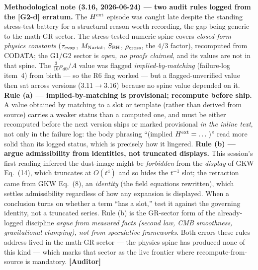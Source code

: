 \documentclass[11pt]{article}
\newcommand{\Auditor}{\textbf{\textcolor{teal!55!black}{[Auditor]}}}
\begin{document}
\smallskip\noindent\textbf{Methodological note (3.16, 2026-06-24) --- two audit rules logged from the [G2-d] erratum.} The $H^{\rm ext}$ episode was caught late despite the standing stress-test battery for a structural reason worth recording, the gap being generic to the math-GR sector. The stress-tested numeric spine covers \emph{closed-form physics constants} ($\tau_{\rm evap}$, $M_{\rm Nariai}$, $S_{\rm BH}$, $\rho_{\rm cross}$, the $4/3$ factor), recomputed from CODATA; the G1/G2 sector is \emph{open, no proofs claimed}, and its values are not in that spine. The $\tfrac{3}{16}\rho_{d0}/A$ value was flagged \emph{implied-by-matching} (failure-log item~4) from birth --- so the R6 flag worked --- but a flagged-unverified value then sat across versions (3.11$\to$3.16) because no spine value depended on it. \textbf{Rule (a) --- implied-by-matching is provisional; recompute before ship.} A value obtained by matching to a slot or template (rather than derived from source) carries a weaker status than a computed one, and must be either recomputed before the next version ships or marked provisional \emph{in the inline text}, not only in the failure log: the body phrasing ``(implied $H^{\rm ext}=\dots$)'' read more solid than its logged status, which is precisely how it lingered. \textbf{Rule (b) --- argue admissibility from identities, not truncated displays.} This session's first reading inferred the dust-image might be \emph{forbidden} from the \emph{display} of GKW Eq.~(14), which truncates at $O(t^4)$ and so hides the $t^{-1}$ slot; the retraction came from GKW Eq.~(8), an \emph{identity} (the field equations rewritten), which settles admissibility regardless of how any expansion is displayed. When a conclusion turns on whether a term ``has a slot,'' test it against the governing identity, not a truncated series. Rule (b) is the GR-sector form of the already-logged discipline \emph{argue from measured facts (second law, CMB smoothness, gravitational clumping), not from speculative frameworks}. Both errors these rules address lived in the math-GR sector --- the physics spine has produced none of this kind --- which marks that sector as the live frontier where recompute-from-source is mandatory. \Auditor
\end{document}
